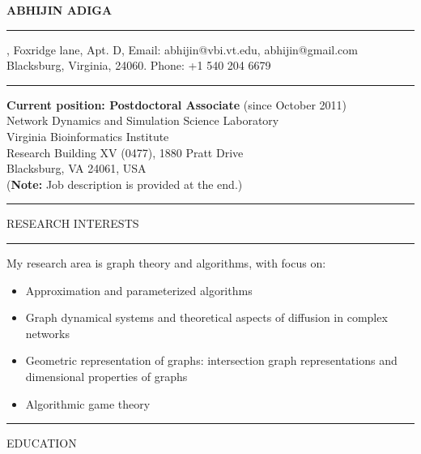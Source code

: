 \documentclass{article}
\begin{document}
\noindent\textbf{ABHIJIN ADIGA} \\ 
\vspace{-3mm}\hrule\vspace{2mm}
, Foxridge lane, Apt. D, \hfill Email:
abhijin@vbi.vt.edu, abhijin@gmail.com \\
Blacksburg, Virginia, 24060. \hfill Phone: +1 540 204 6679\\
\vspace{-2mm}\hrule\vspace{2mm}
\noindent\textbf{Current position: Postdoctoral Associate} (since October
2011) \\
Network Dynamics and Simulation Science Laboratory\\
Virginia Bioinformatics Institute\\
Research Building XV (0477), 1880 Pratt Drive\\
Blacksburg, VA 24061, USA\\
(\textbf{Note:} Job description is provided at the end.)\\
\vspace{-2mm}\hrule\vspace{-2mm}
\begin{center}
RESEARCH INTERESTS \\
\end{center}
\vspace{-2mm}\hrule\vspace{5mm}
My research area is graph theory and algorithms, with focus on:
\begin{itemize}
\item Approximation and parameterized algorithms
\item Graph dynamical systems and theoretical aspects of diffusion in
complex networks
\item Geometric representation of graphs: intersection graph
representations and dimensional properties of graphs
\item Algorithmic game theory
\end{itemize}
\vspace{0mm}\hrule\vspace{-2mm}
\begin{center}
EDUCATION \\
\end{center}
\end{document}
